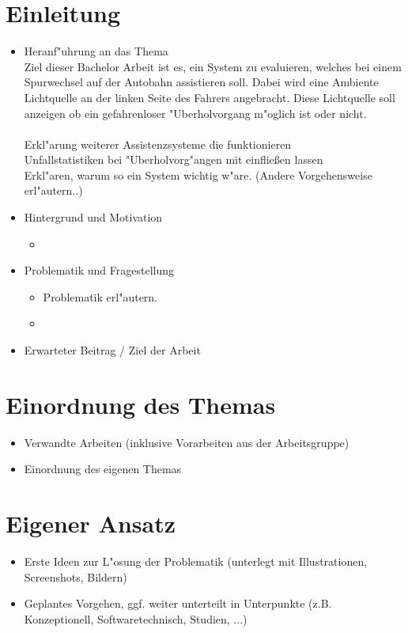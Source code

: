 \documentclass[a4paper, 11pt]{article}
\begin{document}
\section{Einleitung}
\begin{itemize}
\item Heranf"{u}hrung an das Thema\\
Ziel dieser Bachelor Arbeit ist es, ein System zu evaluieren, welches bei einem Spurwechsel auf der Autobahn assistieren soll. Dabei wird eine Ambiente Lichtquelle an der linken Seite des Fahrers angebracht. Diese Lichtquelle soll anzeigen ob ein gefahrenloser "{U}berholvorgang m"{o}glich ist oder nicht. \\
\\
Erkl"{a}rung weiterer Assistenzsysteme die funktionieren\\
Unfallstatistiken bei "{U}berholvorg"{a}ngen mit einflie{\ss}en lassen\\
Erkl"{a}ren, warum so ein System wichtig w"{a}re. (Andere Vorgehensweise erl"{a}utern..)\\


\item Hintergrund und Motivation
	\begin{itemize}
	\item{}
	\end{itemize}
\item Problematik und Fragestellung
	\begin{itemize}
	\item{Problematik erl"{a}utern.}
	\item{}
	\end{itemize}
\item Erwarteter Beitrag / Ziel der Arbeit
\end{itemize}

\section{Einordnung des Themas}
\begin{itemize}
\item Verwandte Arbeiten (inklusive Vorarbeiten aus der Arbeitsgruppe)
\item Einordnung des eigenen Themas
\end{itemize}

\section{Eigener Ansatz}
\begin{itemize}
\item Erste Ideen zur L"{o}sung der Problematik (unterlegt mit Illustrationen, Screenshots, Bildern)\\
\item Geplantes Vorgehen, ggf. weiter unterteilt in Unterpunkte (z.B. Konzeptionell, Softwaretechnisch, Studien, ...)
\end{itemize}
\end{document}
